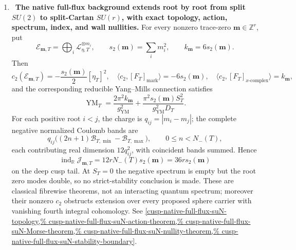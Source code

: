 \begin{enumerate}[leftmargin=1.8em,itemsep=.65em]
\item \Verified\ \textbf{The native full-flux background extends root by
root from split \(SU(2)\) to split-Cartan \(SU(r)\), with exact topology,
action, spectrum, index, and wall nullities.}
For every nonzero trace-zero \(\mathbf m\in\mathbb Z^r\), put
\[
 \mathscr E_{\mathbf m,T}
 =\bigoplus_i\mathscr L_{\eta,T}^{\otimes m_i},
 \qquad s_2(\mathbf m)=\sum_i m_i^2,
 \qquad k_{\mathbf m}=6s_2(\mathbf m).
\]
Then
\[
 c_2(\mathscr E_{\mathbf m,T})
 =-\frac{s_2(\mathbf m)}2[\eta_T]^2,
 \quad
 \langle c_2,[F_T]_{\mathrm{mark}}\rangle=-6s_2(\mathbf m),
 \quad
 \langle c_2,[F_T]_{x\text{-}\mathrm{complex}}\rangle=k_{\mathbf m},
\]
and the corresponding reducible Yang--Mills connection satisfies
\[
 \operatorname{YM}_T
 =\frac{2\pi^2k_{\mathbf m}}{g_{\mathrm{YM}}^2}
  +\frac{\pi^2s_2(\mathbf m)S_T^2}{g_{\mathrm{YM}}^2D_T}.
\]
For each positive root \(i<j\), the charge is
\(q_{ij}=|m_i-m_j|\); the complete negative normalized Coulomb bands are
\[
 q_{ij}\bigl((2n+1)\mathcal B_{T,\min}-\mathcal B_{T,\max}\bigr),
 \qquad 0\le n<N_-(T),
\]
each contributing real dimension \(12q_{ij}^2\), with coincident bands
summed.  Hence
\[
 \operatorname{ind}_{\mathbb R}\mathcal J_{\mathbf m,T}
 =12rN_-(T)s_2(\mathbf m)
 =36r s_2(\mathbf m)
\]
on the deep cusp tail.  At \(S_T=0\) the negative spectrum is empty but the
root zero modes double, so no strict-stability conclusion is made.  These are
classical fibrewise theorems, not an interacting quantum spectrum; moreover
their nonzero \(c_2\) obstructs extension over every proposed sphere carrier
with vanishing fourth integral cohomology.  See
\cref{cusp-native-full-flux-suN-topology,%
cusp-native-full-flux-suN-action-theorem,%
cusp-native-full-flux-suN-Morse-theorem,%
cusp-native-full-flux-suN-nullity-theorem,%
cusp-native-full-flux-suN-stability-boundary}.


\end{enumerate}
